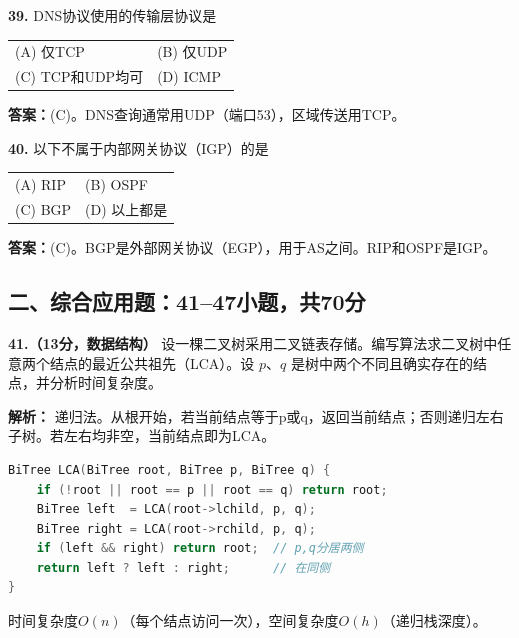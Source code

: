 \vspace{6pt}

\noindent\textbf{39.} DNS协议使用的传输层协议是
\begin{center}
\begin{tabular}{ll}
(A) 仅TCP & (B) 仅UDP \\[6pt]
(C) TCP和UDP均可 & (D) ICMP
\end{tabular}
\end{center}

\ifshowsolutions\par\noindent\textbf{答案：}(C)。DNS查询通常用UDP（端口53），区域传送用TCP。\else \answerarea \fi

\vspace{6pt}

\noindent\textbf{40.} 以下不属于内部网关协议（IGP）的是
\begin{center}
\begin{tabular}{ll}
(A) RIP & (B) OSPF \\[6pt]
(C) BGP & (D) 以上都是
\end{tabular}
\end{center}

\ifshowsolutions\par\noindent\textbf{答案：}(C)。BGP是外部网关协议（EGP），用于AS之间。RIP和OSPF是IGP。\else \answerarea \fi

\newpage

\subsection*{二、综合应用题：41--47小题，共70分}

\noindent\textbf{41.（13分，数据结构）} 设一棵二叉树采用二叉链表存储。编写算法求二叉树中任意两个结点的最近公共祖先（LCA）。设 $p$、$q$ 是树中两个不同且确实存在的结点，并分析时间复杂度。

\ifshowsolutions\par\noindent\textbf{解析：} 递归法。从根开始，若当前结点等于p或q，返回当前结点；否则递归左右子树。若左右均非空，当前结点即为LCA。
\begin{lstlisting}[language=C]
BiTree LCA(BiTree root, BiTree p, BiTree q) {
    if (!root || root == p || root == q) return root;
    BiTree left  = LCA(root->lchild, p, q);
    BiTree right = LCA(root->rchild, p, q);
    if (left && right) return root;  // p,q分居两侧
    return left ? left : right;      // 在同侧
}
\end{lstlisting}
时间复杂度$O(n)$（每个结点访问一次），空间复杂度$O(h)$（递归栈深度）。\else \answerarea[8] \fi

